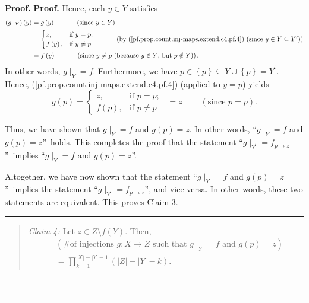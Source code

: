 \documentclass[numbers=enddot,12pt,final,onecolumn,notitlepage]{scrartcl}%
\numberwithin{exer}{section}
\theoremstyle{definition}
\newenvironment{statement}{\begin{quote}}{\end{quote}}
\newenvironment{proof}[1][Proof]{\noindent\textbf{#1.} }{\ \rule{0.5em}{0.5em}}
\let\prodnonlimits\prod
\renewcommand{\prod}{\prodnonlimits\limits}
\newenvironment{verlong}{}{}
\begin{document}
\begin{verlong}
\begin{proof}
\begin{proof}
Hence, each $y\in Y$ satisfies%
\begin{align*}
\left(  g\mid_{Y}\right)  \left(  y\right)   &  =g\left(  y\right)
\ \ \ \ \ \ \ \ \ \ \left(  \text{since }y\in Y\right) \\
&  =%
\begin{cases}
z, & \text{if }y=p;\\
f\left(  y\right)  , & \text{if }y\neq p
\end{cases}
\ \ \ \ \ \ \ \ \ \ \left(  \text{by
(\ref{pf.prop.count.inj-maps.extend.c4.pf.4}) (since }y\in Y\subseteq
Y^{\prime}\text{)}\right) \\
&  =f\left(  y\right)  \ \ \ \ \ \ \ \ \ \ \left(  \text{since }y\neq p\text{
(because }y\in Y\text{, but }p\notin Y\text{)}\right)  .
\end{align*}
In other words, $\left.  g\mid_{Y}\right.  =f$. Furthermore, we have
$p\in\left\{  p\right\}  \subseteq Y\cup\left\{  p\right\}  =Y^{\prime}$.
Hence, (\ref{pf.prop.count.inj-maps.extend.c4.pf.4}) (applied to $y=p$) yields%
\[
g\left(  p\right)  =%
\begin{cases}
z, & \text{if }p=p;\\
f\left(  p\right)  , & \text{if }p\neq p
\end{cases}
\ \ =z\ \ \ \ \ \ \ \ \ \ \left(  \text{since }p=p\right)  .
\]


Thus, we have shown that $\left.  g\mid_{Y}\right.  =f$ and $g\left(
p\right)  =z$. In other words, \textquotedblleft$\left.  g\mid_{Y}\right.  =f$
and $g\left(  p\right)  =z$\textquotedblright\ holds. This completes the proof
that the statement \textquotedblleft$\left.  g\mid_{Y^{\prime}}\right.
=f_{p\rightarrow z}$\textquotedblright\ implies \textquotedblleft$\left.
g\mid_{Y}\right.  =f$ and $g\left(  p\right)  =z$\textquotedblright.

Altogether, we have now shown that the statement \textquotedblleft$\left.
g\mid_{Y}\right.  =f$ and $g\left(  p\right)  =z$\textquotedblright\ implies
the statement \textquotedblleft$\left.  g\mid_{Y^{\prime}}\right.
=f_{p\rightarrow z}$\textquotedblright, and vice versa. In other words, these
two statements are equivalent. This proves Claim 3.
\end{proof}

\begin{statement}
\textit{Claim 4:} Let $z\in Z\setminus f\left(  Y\right)  $. Then,%
\begin{align*}
&  \left(  \text{\# of injections }g:X\rightarrow Z\text{ such that }\left.
g\mid_{Y}\right.  =f\text{ and }g\left(  p\right)  =z\right) \\
&  =\prod_{k=1}^{\left\vert X\right\vert -\left\vert Y\right\vert -1}\left(
\left\vert Z\right\vert -\left\vert Y\right\vert -k\right)  .
\end{align*}


\end{statement}
\end{proof}
\end{verlong}
\end{document}
